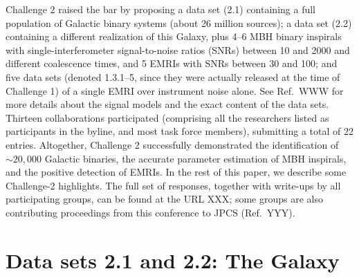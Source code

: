 \documentclass{iopart}
\begin{document}
Challenge 2 raised the bar by proposing a data set (2.1) containing a full population of Galactic binary systems (about 26 million sources); a data set (2.2) containing a different realization of this Galaxy, plus 4--6 MBH binary inspirals with single-interferometer signal-to-noise ratios (SNRs) between 10 and 2000 and different coalescence times, and 5 EMRIs with SNRs between 30 and 100; and five data sets (denoted 1.3.1--5, since they were actually released at the time of Challenge 1) of a single EMRI over instrument noise alone. See Ref.\ WWW for more details about the signal models and the exact content of the data sets. Thirteen collaborations participated (comprising all the researchers listed as participants in the byline, and most task force members), submitting a total of 22 entries. Altogether, Challenge 2 successfully demonstrated the identification of $\sim 20,000$ Galactic binaries, the accurate parameter estimation of MBH inspirals, and the positive detection of EMRIs. In the rest of this paper, we describe some Challenge-2 highlights. The full set of responses, together with write-ups by all participating groups, can be found at the URL XXX; some groups are also contributing proceedings from this conference to JPCS (Ref.\ YYY).

\section{Data sets 2.1 and 2.2: The Galaxy}
\end{document}
